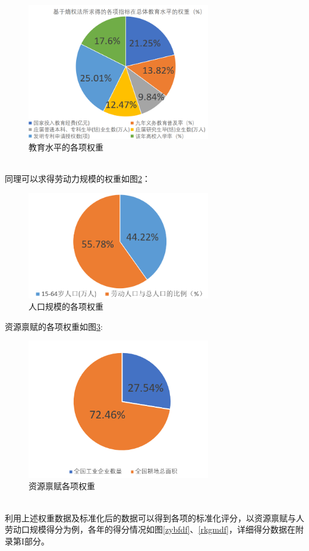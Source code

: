 \documentclass[UTF8]{article}
\begin{document}
	\begin{figure}[htb]
	\centering
	\includegraphics[width=8cm]{pictures/jyqz.png}
	\caption{教育水平的各项权重}
	\label{jyqz}
	\end{figure}
	\\同理可以求得劳动力规模的权重如图\ref{ldlqz}：
	\newpage
	\begin{figure}[htb]
	\centering
	\includegraphics[width=8cm]{pictures/ldlqz.png}
	\caption{人口规模的各项权重}
	\label{ldlqz}
	\end{figure}
	资源禀赋的各项权重如图\ref{zybfqz}:
	\begin{figure}[htb]
	\centering
	\includegraphics[width=8cm]{pictures/zybfqz.png}
	\caption{资源禀赋各项权重}
	\label{zybfqz}
	\end{figure}
	\\利用上述权重数据及标准化后的数据可以得到各项的标准化评分，以资源禀赋与人劳动口规模得分为例，各年的得分情况如图\ref{zybfdf}、\ref{rkgmdf}，详细得分数据在附录第I部分。
\end{document}
